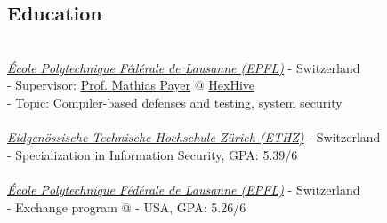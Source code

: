 \documentclass[mm, 11pt]{simple_style}
\begin{document}
\begin{resume}
\section{Education}
\\
\textsl{\href{https://ic.epfl.ch/en}{\'Ecole Polytechnique F\'ed\'erale de Lausanne (EPFL)}} - Switzerland\\
- Supervisor: \href{https://nebelwelt.net/}{Prof. Mathias Payer} @ \href{https://hexhive.epfl.ch}{HexHive}\\
- Topic: Compiler-based defenses and testing, system security\\
\\
\textsl{\href{https://www.inf.ethz.ch/}{Eidgen\"ossische Technische Hochschule Z\"urich (ETHZ)}} - Switzerland\\
- Specialization in Information Security, GPA: 5.39/6\\
\\
\textsl{\href{https://ic.epfl.ch/en}{\'Ecole Polytechnique F\'ed\'erale de Lausanne (EPFL)}} - Switzerland\\
- Exchange program @
 - USA, GPA: 5.26/6
\\
\sectionline

\end{resume}
\end{document}
